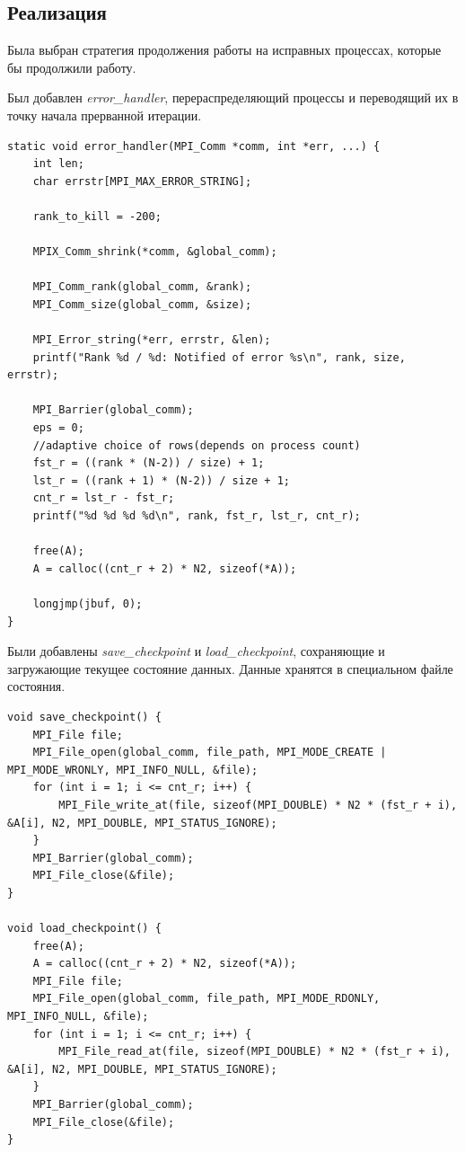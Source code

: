 \documentclass[a4paper,12pt,titlepage,final]{article}
\begin{document}
\subsection{Реализация}
Была выбран стратегия продолжения работы на исправных процессах, которые бы продолжили работу.\par
Был добавлен \textit{error\_handler}, перераспределяющий процессы и переводящий их в точку начала прерванной итерации.
\begin{verbatim}
static void error_handler(MPI_Comm *comm, int *err, ...) {
    int len;
    char errstr[MPI_MAX_ERROR_STRING];

    rank_to_kill = -200;

    MPIX_Comm_shrink(*comm, &global_comm);
    
    MPI_Comm_rank(global_comm, &rank);
    MPI_Comm_size(global_comm, &size);
    
    MPI_Error_string(*err, errstr, &len);
    printf("Rank %d / %d: Notified of error %s\n", rank, size, errstr);
    
    MPI_Barrier(global_comm);
    eps = 0;
    //adaptive choice of rows(depends on process count)
    fst_r = ((rank * (N-2)) / size) + 1;
    lst_r = ((rank + 1) * (N-2)) / size + 1;
    cnt_r = lst_r - fst_r;
    printf("%d %d %d %d\n", rank, fst_r, lst_r, cnt_r);

    free(A);
    A = calloc((cnt_r + 2) * N2, sizeof(*A));

    longjmp(jbuf, 0);
}
\end{verbatim}
Были добавлены \textit{save\_checkpoint} и \textit{load\_checkpoint}, сохраняющие и загружающие текущее состояние данных. Данные хранятся в специальном файле состояния.
\begin{verbatim}
void save_checkpoint() {
    MPI_File file;
    MPI_File_open(global_comm, file_path, MPI_MODE_CREATE | MPI_MODE_WRONLY, MPI_INFO_NULL, &file);
    for (int i = 1; i <= cnt_r; i++) {
        MPI_File_write_at(file, sizeof(MPI_DOUBLE) * N2 * (fst_r + i), &A[i], N2, MPI_DOUBLE, MPI_STATUS_IGNORE);
    }
    MPI_Barrier(global_comm);
    MPI_File_close(&file);
}

void load_checkpoint() {
    free(A);
    A = calloc((cnt_r + 2) * N2, sizeof(*A));
    MPI_File file;
    MPI_File_open(global_comm, file_path, MPI_MODE_RDONLY, MPI_INFO_NULL, &file);
    for (int i = 1; i <= cnt_r; i++) {
        MPI_File_read_at(file, sizeof(MPI_DOUBLE) * N2 * (fst_r + i), &A[i], N2, MPI_DOUBLE, MPI_STATUS_IGNORE);
    }
    MPI_Barrier(global_comm);
    MPI_File_close(&file);
}
\end{verbatim}
\end{document}
